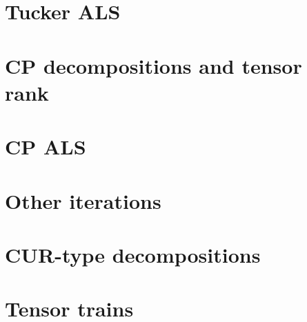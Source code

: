 \documentclass[12pt, leqno]{article} %
\begin{document}
\section{Tucker ALS}

\section{CP decompositions and tensor rank}

\section{CP ALS}

\section{Other iterations}


\section{CUR-type decompositions}

\section{Tensor trains}
\end{document}
